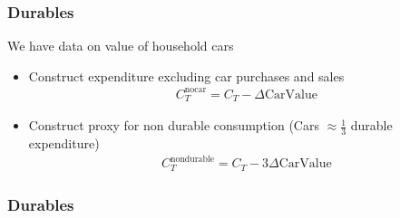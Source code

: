\documentclass{beamer}
\begin{document}
\frame
{
	\frametitle{Durables}
	We have data on value of household cars\\
	\begin{itemize}
		\item Construct expenditure excluding car purchases and sales
		\begin{align*}
		C_T^{\text{nocar}} = C_T - \Delta \text{CarValue}
		\end{align*}
		\item Construct proxy for non durable consumption (Cars $\approx \frac{1}{3}$ durable expenditure)
		\begin{align*}
		C_T^{\text{nondurable}} = C_T - 3\Delta \text{CarValue}
		\end{align*}
	\end{itemize}
}
\frame
{
	\frametitle{Durables}
	\begin{center}
\end{center}}
\end{document}
